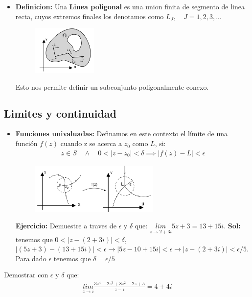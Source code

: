 \documentclass{article}
\newcommand{\caja}[3]{%
  \begin{tcolorbox}[colback=#1!5!white,colframe=#1!25!black,title=#2]
    #3
  \end{tcolorbox}%
}
\begin{document}
\begin{itemize}
  \item \textbf{Definicion: } Una \textbf{Linea poligonal } es una union finita de segmento de linea recta, cuyos extremos finales los denotamos como $ L_J, \quad J = 1,2,3,...  $
    \begin{figure}[H]
      \begin{center}
        \includegraphics[width=0.3\textwidth]{linea_poligonal.png}
      \end{center}
    \end{figure}
  Esto nos permite definir un subconjunto poligonalmente conexo.
\end{itemize}

\subsection{Limites y continuidad}
\begin{itemize}
  \item \textbf{Funciones univaluadas: }Definamos en este contexto el límite de una función $ f(z)  $ cuando z se acerca a $ z_0  $ como $ L  $, si: 
    \begin{gather*}
      z \in S \quad \land \quad 0<\left|z-z_0 \right|<\delta \implies \left|f(z) - L \right| < \epsilon 
    \end{gather*}
    \begin{figure}[H]
      \begin{center}
        \includegraphics[width=0.6\textwidth]{lim_univaluada.png}
      \end{center}
    \end{figure}
    \textbf{Ejercicio: }Demuestre a traves de $ \epsilon $ y $ \delta $ que: $ \underset{z \rightarrow 2+3i }{lim } 5z + 3 = 13 + 15i $.
    \textbf{Sol: } tenemos que $ 0<\left|z-(2+3i)\right|<\delta $, $ \left|(5z + 3 ) - (13 + 15i)\right|<\epsilon \rightarrow \left|5z - 10 + 15i \right|<\epsilon \rightarrow \left|z - (2 + 3i )\right|< \epsilon/5$. Para dado $ \epsilon $ tenemos que $ \delta = \epsilon/5 $
\end{itemize}
\caja{black}{Ejercicio }{
  Demostrar con $ \epsilon $ y $ \delta $ que: 
  \begin{gather*}
    \underset{z \rightarrow i }{lim }\frac{3z^4 - 2 z^3 + 8z^2 - 2z + 5 }{z-i } = 4 + 4i 
  \end{gather*}
}
\end{document}

